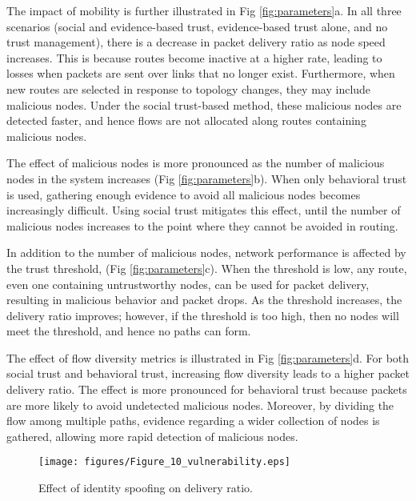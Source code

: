 \documentclass[conference]{IEEEtran}
\begin{document}
The impact of mobility is further illustrated in Fig \ref{fig:parameters}a. In all three scenarios (social and evidence-based trust, evidence-based trust alone, and no trust management), there is a decrease in packet delivery ratio as node speed increases.  This is because routes become inactive at a higher rate, leading to losses when packets are sent over links that no longer exist.  Furthermore, when new routes are selected in response to topology changes, they may include malicious nodes.  Under the social trust-based method, these malicious nodes are detected faster, and hence flows are not allocated along routes containing malicious nodes.



The effect of malicious nodes is more pronounced as the number of malicious nodes in the system increases (Fig \ref{fig:parameters}b).  When only behavioral trust is used, gathering enough evidence to avoid all malicious nodes becomes increasingly difficult.  Using social trust mitigates this effect, until the number of malicious nodes increases to the point where they cannot be avoided in routing.



In addition to the number of malicious nodes, network performance is affected by the trust threshold,  (Fig \ref{fig:parameters}c). When the threshold is low, any route, even one containing untrustworthy nodes, can be used for packet delivery, resulting in malicious behavior and packet drops. As the threshold increases, the delivery ratio improves; however, if the threshold is too high, then no nodes will meet the threshold, and hence no paths can form.



The effect of flow diversity metrics is illustrated in Fig \ref{fig:parameters}d.  For both social trust and behavioral trust, increasing flow diversity leads to a higher packet delivery ratio.  The effect is more pronounced for behavioral trust because packets are more likely to avoid undetected malicious nodes.  Moreover, by dividing the flow among multiple paths, evidence regarding a wider collection of nodes is gathered, allowing more rapid detection of malicious nodes.

\begin{figure}[t]
\centering
\texttt{[image: figures/Figure\_10\_vulnerability.eps]}
\caption{Effect of identity spoofing on delivery ratio.}
\label{fig:vulnerability}
\end{figure}
\end{document}

